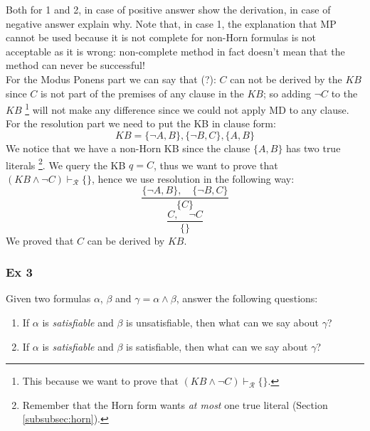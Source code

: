 \documentclass[10pt,a4paper]{article}
\begin{document}
\begin{itemize}
Both for 1 and 2, in case of positive answer show the derivation, in case of negative answer explain why.
Note that, in case 1, the explanation that MP cannot be used because it is not complete for non-Horn formulas is not acceptable as it is wrong: non-complete method in fact doesn’t mean that the method can never be successful!\\

For the Modus Ponens part we can say that (?): $C$ can not be derived by the $KB$ since $C$ is not part of the premises of any clause in the $KB$; so adding $\neg C$ to the $KB$ \footnote{This because we want to prove that $(KB \wedge \neg C)\vdash_{\mathcal{R}}\lbrace\rbrace$.} will not make any difference since we could not apply MD to any clause.\\

For the resolution part we need to  put the KB in clause form:
\[KB= \{\neg A,B\},\{\neg B,C\},\{A,B\}\]
We notice that we have a non-Horn KB since the clause $\lbrace A,B \rbrace$ has two true literals \footnote{Remember that the Horn form wants \textit{at most} one true literal (Section \ref{subsubsec:horn}).}. We query the KB $q=C$, thus we want to prove that $(KB \wedge \neg C)\vdash_{\mathcal{R}}\lbrace\rbrace$, hence we use resolution in the following way:
\[\frac{\lbrace \neg A,B\rbrace,\quad \lbrace\neg B,C\rbrace}{\{C\}}\]
\[\frac{ C,\quad \neg C }{\{\}}\]
We proved that $C$  can be derived by $KB$.

\subsubsection{Ex 3}

Given two formulas $\alpha$, $\beta$ and $\gamma=\alpha \wedge \beta$, answer the following questions:
\begin{enumerate}
\item If $\alpha$ is \textit{satisfiable} and $\beta$ is unsatisfiable, then what can we say about $\gamma$?
\item If $\alpha$ is \textit{satisfiable} and $\beta$ is satisfiable, then what can we say about $\gamma$?\end{enumerate}


\end{itemize}
\end{document}
